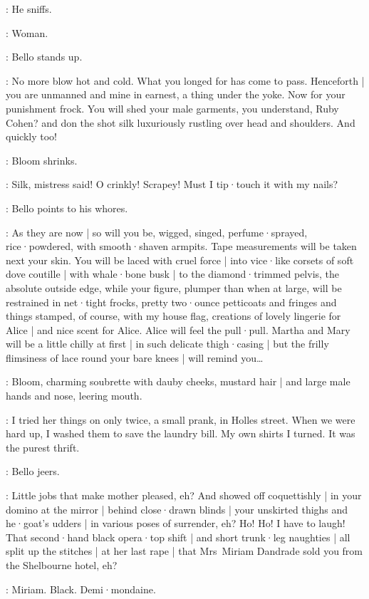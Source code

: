 :
He sniffs.

\Bloom:
Woman.

:
Bello stands up.

\Bello:
No more blow hot and cold.
What you longed for has come to pass.
Henceforth |
you are unmanned and mine in earnest,
a thing under the yoke.
Now for your punishment frock.
You will shed your male garments,
you understand,
Ruby Cohen?
and don the shot silk luxuriously rustling over head and shoulders.
And quickly too!

:
Bloom shrinks.

\Bloom:
Silk,
mistress said!
O crinkly!
Scrapey!
Must I tip·touch it with my nails?

:
Bello points to his whores.

\Bello:
As they are now |
so will you be,
wigged,
singed,
perfume·sprayed,
rice·powdered,
with smooth·shaven armpits.
Tape measurements will be taken next your skin.
You will be laced with cruel force |
into vice·like corsets of soft dove coutille |
with whale·bone busk |
to the diamond·trimmed pelvis,
the absolute outside edge,
while your figure,
plumper than when at large,
will be restrained in net·tight frocks,
pretty two·ounce petticoats and fringes and things stamped,
of course,
with my house flag,
%
creations of lovely lingerie for Alice |
and nice scent for Alice.
Alice will feel the pull·pull.
Martha and Mary will be a little chilly at first |
in such delicate thigh·casing |
but the frilly flimsiness of lace round your bare knees |
will remind you…

:
Bloom,
charming soubrette with dauby cheeks,
mustard hair |
and large male hands and nose,
leering mouth.

\Bloom:
I tried her things on only twice,
a small prank,
in Holles street.
When we were hard up,
I washed them to save the laundry bill.
My own shirts I turned.
It was the purest thrift.

:
Bello jeers.

\Bello:
Little jobs that make mother pleased,
eh?
%
And showed off coquettishly |
in your domino at the mirror |
behind close·drawn blinds |
your unskirted thighs and he·goat's udders |
in various poses of surrender,
eh?
Ho!
Ho!
I have to laugh!
That second·hand black opera·top shift |
and short trunk·leg naughties |
all split up the stitches |
at her last rape |
that Mrs~Miriam Dandrade sold you from the Shelbourne hotel,
eh?

\Bloom:
Miriam.
Black.
Demi·mondaine.

